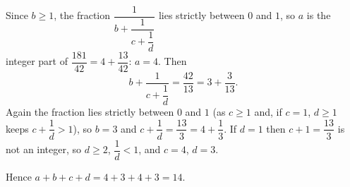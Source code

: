 Since $b\ge1$, the fraction $\dfrac{1}{b+\dfrac{1}{c+\dfrac{1}{d}}}$ lies strictly between $0$ and $1$, so $a$ is the integer part of $\dfrac{181}{42}=4+\dfrac{13}{42}$: $a=4$. Then
\[
b+\dfrac{1}{c+\dfrac{1}{d}}=\dfrac{42}{13}=3+\dfrac{3}{13}.
\]
Again the fraction lies strictly between $0$ and $1$ (as $c\ge1$ and, if $c=1$, $d\ge1$ keeps $c+\dfrac{1}{d}>1$), so $b=3$ and $c+\dfrac{1}{d}=\dfrac{13}{3}=4+\dfrac{1}{3}$. If $d=1$ then $c+1=\dfrac{13}{3}$ is not an integer, so $d\ge2$, $\dfrac{1}{d}<1$, and $c=4$, $d=3$.

Hence $a+b+c+d=4+3+4+3=\boxed{14}$.
